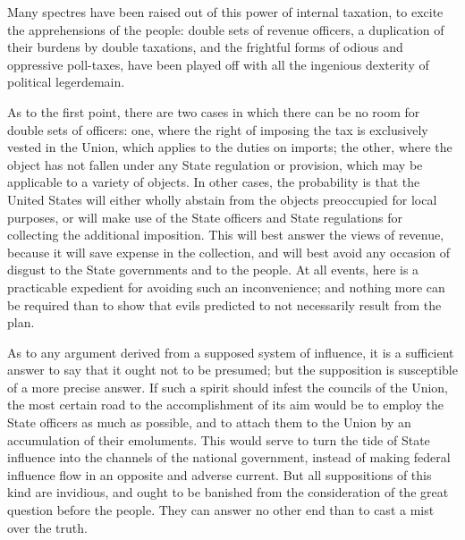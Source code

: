 Many spectres have been raised out of this power of internal taxation, to excite the apprehensions of the people: double sets of revenue officers, a duplication of their burdens by double taxations, and the frightful forms of odious and oppressive poll-taxes, have been played off with all the ingenious dexterity of political legerdemain.

As to the first point, there are two cases in which there can be no room for double sets of officers: one, where the right of imposing the tax is exclusively vested in the Union, which applies to the duties on imports; the other, where the object has not fallen under any State regulation or provision, which may be applicable to a variety of objects. In other cases, the probability is that the United States will either wholly abstain from the objects preoccupied for local purposes, or will make use of the State officers and State regulations for collecting the additional imposition. This will best answer the views of revenue, because it will save expense in the collection, and will best avoid any occasion of disgust to the State governments and to the people. At all events, here is a practicable expedient for avoiding such an inconvenience; and nothing more can be required than to show that evils predicted to not necessarily result from the plan.

As to any argument derived from a supposed system of influence, it is a sufficient answer to say that it ought not to be presumed; but the supposition is susceptible of a more precise answer. If such a spirit should infest the councils of the Union, the most certain road to the accomplishment of its aim would be to employ the State officers as much as possible, and to attach them to the Union by an accumulation of their emoluments. This would serve to turn the tide of State influence into the channels of the national government, instead of making federal influence flow in an opposite and adverse current. But all suppositions of this kind are invidious, and ought to be banished from the consideration of the great question before the people. They can answer no other end than to cast a mist over the truth.

